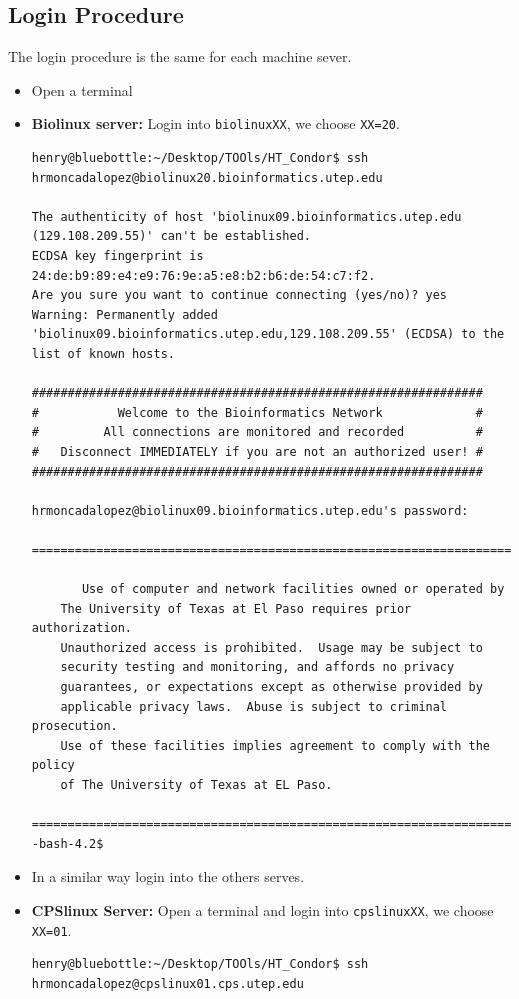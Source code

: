 \documentclass{article}
\begin{document}
\subsection{Login Procedure}
The login procedure is the same for each machine sever.
\begin{itemize}
\item Open a terminal
\item \textbf{Biolinux server:} Login into \verb+biolinuxXX+, we choose \verb+XX=20+.
\scriptsize\begin{verbatim}
henry@bluebottle:~/Desktop/TOOls/HT_Condor$ ssh hrmoncadalopez@biolinux20.bioinformatics.utep.edu

The authenticity of host 'biolinux09.bioinformatics.utep.edu (129.108.209.55)' can't be established.
ECDSA key fingerprint is 24:de:b9:89:e4:e9:76:9e:a5:e8:b2:b6:de:54:c7:f2.
Are you sure you want to continue connecting (yes/no)? yes
Warning: Permanently added 'biolinux09.bioinformatics.utep.edu,129.108.209.55' (ECDSA) to the list of known hosts.

###############################################################
#           Welcome to the Bioinformatics Network             #
#         All connections are monitored and recorded          #
#   Disconnect IMMEDIATELY if you are not an authorized user! #
###############################################################

hrmoncadalopez@biolinux09.bioinformatics.utep.edu's password: 

=============================================================================

       Use of computer and network facilities owned or operated by
    The University of Texas at El Paso requires prior authorization.
    Unauthorized access is prohibited.  Usage may be subject to
    security testing and monitoring, and affords no privacy
    guarantees, or expectations except as otherwise provided by
    applicable privacy laws.  Abuse is subject to criminal prosecution.
    Use of these facilities implies agreement to comply with the policy
    of The University of Texas at EL Paso.

=============================================================================
-bash-4.2$ 
\end{verbatim}
\normalsize
\item In a similar way login into the others serves.
\item \textbf{CPSlinux Server:} Open a terminal and login into \verb+cpslinuxXX+, we choose \verb+XX=01+.
\scriptsize\begin{verbatim}
henry@bluebottle:~/Desktop/TOOls/HT_Condor$ ssh hrmoncadalopez@cpslinux01.cps.utep.edu


\end{verbatim}
\end{itemize}
\end{document}
